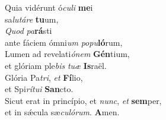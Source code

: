 \evenverse Quia vidérunt ó\textit{cu}\textit{li} \textbf{me}i~\*\\
\evenverse sa\textit{lu}\textit{tá}\textit{re} \textbf{tu}um,\\
\oddverse \textit{Quod} \textit{pa}\textbf{rá}sti~\*\\
\oddverse ante fáciem ómni\textit{um} \textit{po}\textit{pu}\textbf{ló}rum,\\
\evenverse Lumen ad revelati\textit{ó}\textit{nem} \textbf{Gén}tium,~\*\\
\evenverse et glóriam ple\textit{bis} \textit{tu}\textit{æ} \textbf{Is}raël.\\
\oddverse Glória Pa\textit{tri}, \textit{et} \textbf{Fí}lio,~\*\\
\oddverse et Spi\textit{rí}\textit{tu}\textit{i} \textbf{San}cto.\\
\evenverse Sicut erat in princípio, et \textit{nunc}, \textit{et} \textbf{sem}per,~\*\\
\evenverse et in sǽcula sæ\textit{cu}\textit{ló}\textit{rum}. \textbf{A}men.\\
